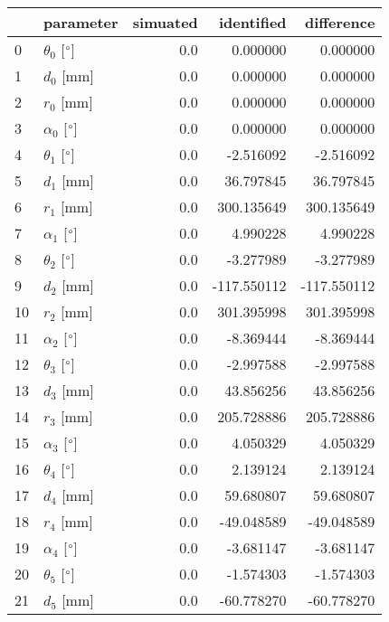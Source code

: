 \documentclass{standalone}%
\begin{document}
%
\normalsize%
\begin{tabular}{llrrr}
\toprule
{} &                 parameter & simuated &  identified &  difference \\
\midrule
0  &  $\theta_{0}$ [$\degree$] &      0.0 &    0.000000 &    0.000000 \\
1  &              $d_{0}$ [mm] &      0.0 &    0.000000 &    0.000000 \\
2  &              $r_{0}$ [mm] &      0.0 &    0.000000 &    0.000000 \\
3  &  $\alpha_{0}$ [$\degree$] &      0.0 &    0.000000 &    0.000000 \\
4  &  $\theta_{1}$ [$\degree$] &      0.0 &   -2.516092 &   -2.516092 \\
5  &              $d_{1}$ [mm] &      0.0 &   36.797845 &   36.797845 \\
6  &              $r_{1}$ [mm] &      0.0 &  300.135649 &  300.135649 \\
7  &  $\alpha_{1}$ [$\degree$] &      0.0 &    4.990228 &    4.990228 \\
8  &  $\theta_{2}$ [$\degree$] &      0.0 &   -3.277989 &   -3.277989 \\
9  &              $d_{2}$ [mm] &      0.0 & -117.550112 & -117.550112 \\
10 &              $r_{2}$ [mm] &      0.0 &  301.395998 &  301.395998 \\
11 &  $\alpha_{2}$ [$\degree$] &      0.0 &   -8.369444 &   -8.369444 \\
12 &  $\theta_{3}$ [$\degree$] &      0.0 &   -2.997588 &   -2.997588 \\
13 &              $d_{3}$ [mm] &      0.0 &   43.856256 &   43.856256 \\
14 &              $r_{3}$ [mm] &      0.0 &  205.728886 &  205.728886 \\
15 &  $\alpha_{3}$ [$\degree$] &      0.0 &    4.050329 &    4.050329 \\
16 &  $\theta_{4}$ [$\degree$] &      0.0 &    2.139124 &    2.139124 \\
17 &              $d_{4}$ [mm] &      0.0 &   59.680807 &   59.680807 \\
18 &              $r_{4}$ [mm] &      0.0 &  -49.048589 &  -49.048589 \\
19 &  $\alpha_{4}$ [$\degree$] &      0.0 &   -3.681147 &   -3.681147 \\
20 &  $\theta_{5}$ [$\degree$] &      0.0 &   -1.574303 &   -1.574303 \\
21 &              $d_{5}$ [mm] &      0.0 &  -60.778270 &  -60.778270 \\

\end{tabular}
\end{document}
